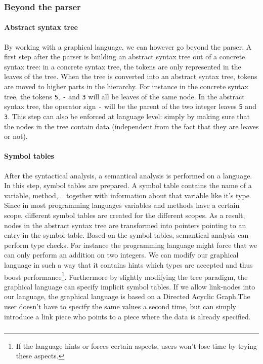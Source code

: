 \subsubsection{Beyond the parser}
\paragraph{Abstract syntax tree}
By working with a graphical language, we can however go beyond the parser. A
first step after the parser is building an abstract syntax tree out of a
concrete syntax tree: in a concrete syntax tree, the tokens are only
represented in the leaves of the tree. When the tree is converted into an
abstract syntax tree, tokens are moved to higher parts in the hierarchy. For
instance in the concrete syntax tree, the tokens \verb+5+, \verb+-+ and
\verb+3+ will all be leaves of the same node. In the abstract syntax tree, the
operator sign \verb+-+ will be the parent of the two integer leaves \verb+5+
and \verb+3+. This step can also be enforced at language level: simply by
making sure that the nodes in the tree contain data (independent from the fact
that they are leaves or not).
\paragraph{Symbol tables}
After the syntactical analysis, a semantical analysis is performed on a
language. In this step, symbol tables are prepared. A symbol table contains the
name of a variable, method,... together with information about that variable
like it's type. Since in most programming languages variables and methods have
a certain scope, different symbol tables are created for the different scopes.
As a result, nodes in the abstract syntax tree are transformed into pointers
pointing to an entry in the symbol table. Based on the symbol tables,
semantical analysis can perform type checks. For instance the programming
language might force that we can only perform an addition on two integers. We
can modify our graphical language in such a way that it contains hints which
types are accepted and thus boost performance\footnote{If the language hints
or forces certain aspects, users won't lose time by trying these aspects.}.
Furthermore by slightly modifying the tree paradigm, the graphical language can
specify implicit symbol tables. If we allow link-nodes into our language, the
graphical language is based on a Directed Acyclic Graph.The user doesn't have to
specify the same values a second time, but can simply introduce a link piece
who points to a piece where the data is already specified.
\subparagraph{}
